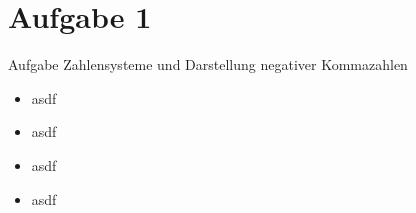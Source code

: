 
\section{Aufgabe 1}

\setcounter{exercise}{1}

\begin{frame}[allowframebreaks]{Aufgabe \thesection}{Zahlensysteme und Darstellung negativer Kommazahlen}
  \begin{requirementsnoinc}
    \begin{itemize}
      \item asdf
    \end{itemize}
  \end{requirementsnoinc}
  \begin{exercisenoinc}
    \begin{itemize}
      \item asdf
    \end{itemize}
  \end{exercisenoinc}
  \begin{solution}
    \begin{itemize}
      \item asdf
    \end{itemize}
  \end{solution}
  \begin{solutionnoinc}
    \begin{itemize}
      \item asdf
    \end{itemize}
  \end{solutionnoinc}
\end{frame}
